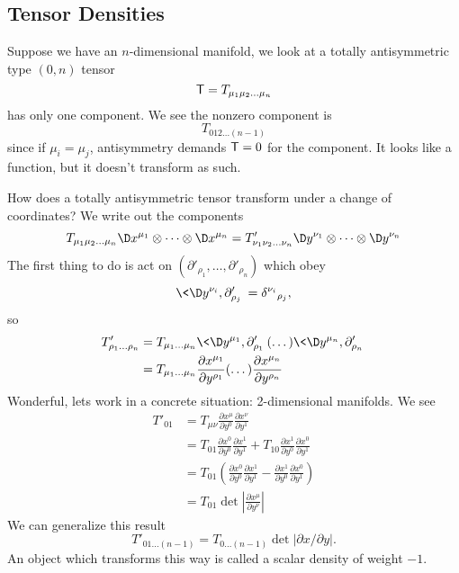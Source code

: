 \subsection{Tensor Densities}
Suppose we have an $n$-dimensional manifold, we look at a totally
antisymmetric type $(0,n)$ tensor
\begin{equation}
\mathsf{T}=T_{\mu_{1}\mu_{2}\dots\mu_{n}}
\end{equation}
has only one component. We see the nonzero component is
\begin{equation}
T_{012\dots(n-1)}
\end{equation}
since if $\mu_{i}=\mu_{j}$, antisymmetry demands $\mathsf{T}=0$ for
the component. It looks like a function, but it doesn't transform
as such.

How does a totally antisymmetric tensor transform under a change
of coordinates? We write out the components
\begin{equation}
T_{\mu_{1}\mu_{2}\dots\mu_{n}}\D x^{\mu_{1}}\otimes\dots\otimes\D x^{\mu_{n}}
=
T'_{\nu_{1}\nu_{2}\dots\nu_{n}}\D y^{\nu_{1}}\otimes\dots\otimes\D y^{\nu_{n}}
\end{equation}
The first thing to do is act on
$(\partial'_{\rho_{1}},\dots,\partial'_{\rho_{n}})$ which obey
\begin{equation}
\<\D y^{\nu_{i}},\partial'_{\rho_{j}}\>={\delta^{\nu_{i}}}_{\rho_{j}},
\end{equation}
so
\begin{equation}
\begin{split}
T'_{\rho_{1}\dots\rho_{n}}
&=T_{\mu_{1}\dots\mu_{n}}\<\D y^{\mu_{1}},\partial'_{\rho_{1}}\>(\dots)
\<\D y^{\mu_{n}},\partial'_{\rho_{n}}\>\\
&=T_{\mu_{1}\dots\mu_{n}}
\frac{\partial x^{\mu_{1}}}{\partial y^{\rho_{1}}}
(\dots)\frac{\partial x^{\mu_{n}}}{\partial y^{\rho_{n}}}
\end{split}
\end{equation}
Wonderful, lets work in a concrete situation: 2-dimensional
manifolds. We see
\begin{subequations}
\begin{align}
T'_{01}
&=T_{\mu\nu}\frac{\partial x^{\mu}}{\partial y^{0}}
\frac{\partial x^{\nu}}{\partial y^{1}}\\
&=T_{01}\frac{\partial x^{0}}{\partial y^{0}}
\frac{\partial x^{1}}{\partial y^{1}}+
T_{10}\frac{\partial x^{1}}{\partial y^{0}}
\frac{\partial x^{0}}{\partial y^{1}}\\
&=T_{01}\left(
\frac{\partial x^{0}}{\partial y^{0}}
\frac{\partial x^{1}}{\partial y^{1}}-
\frac{\partial x^{1}}{\partial y^{0}}
\frac{\partial x^{0}}{\partial y^{1}}
\right)\\
&=T_{01}\det\left|
\frac{\partial x^{\mu}}{\partial y^{\nu}}
\right|
\end{align}
\end{subequations}
We can generalize this result
\begin{equation}
T'_{01\dots(n-1)}=T_{0\dots(n-1)}\det|\partial x/\partial y|.
\end{equation}
An object which transforms this way is called a scalar density of
weight $-1$.

